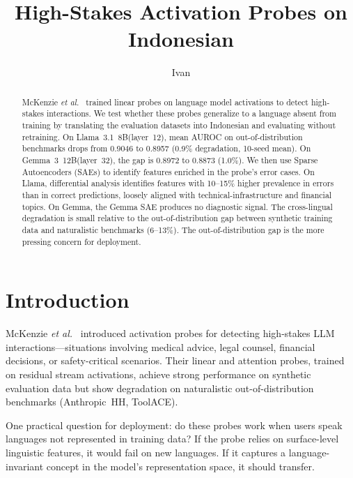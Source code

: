 \documentclass{article}
\title{High-Stakes Activation Probes on Indonesian}
\author{%
  Ivan \\
}
\newcommand{\etal}{\textit{et al.}\xspace}
\newcommand{\auroc}{AUROC\xspace}
\newcommand{\llama}{Llama~3.1~8B\xspace}
\newcommand{\gemma}{Gemma~3~12B\xspace}
\begin{document}
\maketitle


\begin{abstract}
McKenzie \etal~\cite{mckenzie2025} trained linear probes on language model
activations to detect high-stakes interactions.
We test whether these probes generalize to a language absent from training by
translating the evaluation datasets into Indonesian and evaluating without retraining.
On \llama (layer~12), mean \auroc on out-of-distribution benchmarks drops from
0.9046 to 0.8957 (0.9\% degradation, 10-seed mean).
On \gemma (layer~32), the gap is 0.8972 to 0.8873 (1.0\%).
We then use Sparse Autoencoders (SAEs) to identify features enriched in the
probe's error cases.
On Llama, differential analysis identifies features with 10--15\% higher
prevalence in errors than in correct predictions, loosely aligned with
technical-infrastructure and financial topics.
On Gemma, the Gemma SAE produces no diagnostic signal.
The cross-lingual degradation is small relative to the out-of-distribution gap
between synthetic training data and naturalistic benchmarks (6--13\%).
The out-of-distribution gap is the more pressing concern for deployment.
\end{abstract}

\section{Introduction}
\label{sec:intro}

McKenzie \etal~\cite{mckenzie2025} introduced activation probes for detecting
high-stakes LLM interactions---situations involving medical advice, legal counsel,
financial decisions, or safety-critical scenarios.
Their linear and attention probes, trained on residual stream activations,
achieve strong performance on synthetic evaluation data but show degradation on
naturalistic out-of-distribution benchmarks (Anthropic~HH, ToolACE).

One practical question for deployment: do these probes work when users speak
languages not represented in training data?
If the probe relies on surface-level linguistic features, it would fail on
new languages.
If it captures a language-invariant concept in the model's representation space,
it should transfer.
\end{document}
